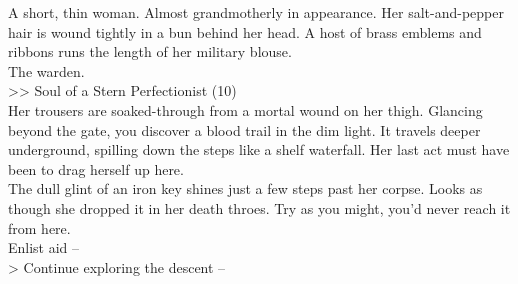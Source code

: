 A short, thin woman. Almost grandmotherly in appearance. Her salt-and-pepper hair is wound tightly in a bun behind her head. A host of brass emblems and ribbons runs the length of her military blouse.\\

The warden.\\
>> Soul of a Stern Perfectionist (10)\\

Her trousers are soaked-through from a mortal wound on her thigh. Glancing beyond the gate, you discover a blood trail in the dim light. It travels deeper underground, spilling down the steps like a shelf waterfall. Her last act must have been to drag herself up here.\\

The dull glint of an iron key shines just a few steps past her corpse. Looks as though she dropped it in her death throes. Try as you might, you’d never reach it from here.\\

 Enlist aid -- \\
> Continue exploring the descent -- 